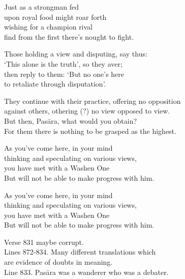 \begin{MyDescription}{}
Just as a strongman fed\\
upon royal food might roar forth\\
wishing for a champion rival\\
find from the first there's nought to fight.
\end{MyDescription}

\begin{MyDescription}{}
Those holding a view and disputing, say thus:\\
`This alone is the truth', so they aver;\\
then reply to them: `But no one's here\\
to retaliate through disputation'.
\end{MyDescription}

\begin{MyDescription}{}
They continue with their practice, offering no opposition\\
against others, othering (?) no view opposed to view.\\
But then, Pas\=ara, what would you obtain?\\
For them there is nothing to be grasped as the highest.
\end{MyDescription}

\begin{MyDescription}{}
As you've come here, in your mind\\
thinking and speculating on various views,\\
you have met with a Washen One\\
But will not be able to make progress with him.
\end{MyDescription}

\begin{MyDescription}{}
As you've come here, in your mind\\
thinking and speculating on various views,\\
you have met with a Washen One\\
But will not be able to make progress with him.
\end{MyDescription}
   
   
   
Verse 831 maybe corrupt.\\
Lines 872-834. Many different translations which\\
are evidence of doubts in meaning.\\
Line 833. Pas\=ara was a wanderer who was a debater.


